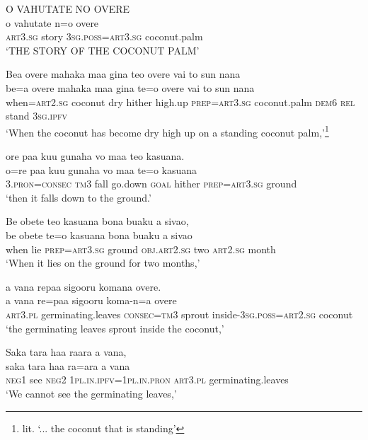\ea\label{ex:text01-1}
O VAHUTATE NO OVERE\\
\gll o	vahutate	n=o	overe\\
     \textsc{art}3.\textsc{sg}	story	3\textsc{sg}.\textsc{poss}=\textsc{art}3.\textsc{sg}	coconut.palm\\
\glt `THE STORY OF THE COCONUT PALM'
\z

\ea\label{ex:text01-2}
Bea overe mahaka maa gina teo overe vai to sun nana\\
\gll be=a	overe	mahaka	maa	gina	te=o	overe	vai	to	sun	nana\\
     when=\textsc{art}2.\textsc{sg}	coconut	dry	hither	high.up	\textsc{prep}=\textsc{art}3.\textsc{sg}	coconut.palm	\textsc{dem}6	\textsc{rel}	stand	3\textsc{sg}.\textsc{ipfv}\\
\glt `When the coconut has become dry high up on a standing coconut palm,'\footnote{lit. `... the coconut that is standing'}
\z

\ea\label{ex:text01-3}
ore paa kuu gunaha vo maa teo kasuana.\\
\gll o=re	paa	kuu	gunaha	vo	maa	te=o	kasuana\\
     3.\textsc{pron}=\textsc{consec}	\textsc{tm}3	fall	go.down	\textsc{goal}	hither	\textsc{prep}=\textsc{art}3.\textsc{sg}	ground\\
\glt `then it falls down to the ground.'
\z

\ea\label{ex:text01-4}
Be obete teo kasuana bona buaku a sivao,\\
\gll be	obete	te=o	kasuana	bona	buaku	a	sivao\\
     when	lie	\textsc{prep}=\textsc{art}3.\textsc{sg}	ground	\textsc{obj}.\textsc{art}2.\textsc{sg}	two	\textsc{art}2.\textsc{sg}	month\\
\glt `When it lies on the ground for two months,'
\z

\ea\label{ex:text01-5}
a vana repaa sigooru komana overe.\\
\gll a	vana	re=paa	sigooru	koma-n=a	overe\\
     \textsc{art}3.\textsc{pl}	germinating.leaves	\textsc{consec}=\textsc{tm}3	sprout	inside-3\textsc{sg}.\textsc{poss}=\textsc{art}2.\textsc{sg}	coconut\\
\glt `the germinating leaves sprout inside the coconut,'
\z

\ea\label{ex:text01-6}
Saka tara haa raara a vana,\\
\gll saka	tara	haa	ra=ara	a	vana\\
     \textsc{neg}1	see	\textsc{neg}2	1\textsc{pl}.\textsc{in}.\textsc{ipfv}=1\textsc{pl}.\textsc{in}.\textsc{pron}	\textsc{art}3.\textsc{pl}	germinating.leaves\\
\glt `We cannot see the germinating leaves,'
\z

